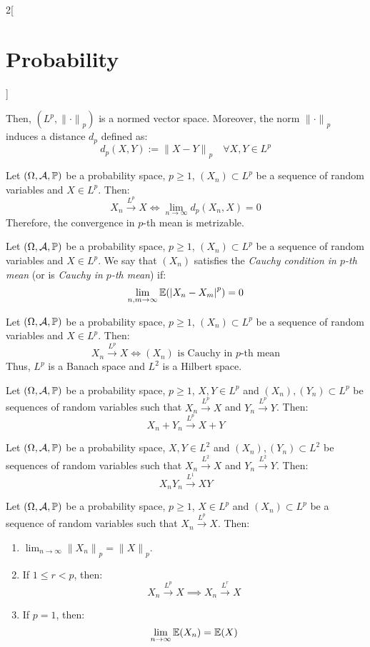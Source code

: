 \documentclass[../../../main.tex]{subfiles}
\begin{document}
\begin{multicols}{2}[\section{Probability}]
\begin{prop}
$$    $$
    Then, $(L^p,{\|\cdot\|}_p)$ is a normed vector space. Moreover, the norm ${\|\cdot\|}_p$ induces a distance $d_p$ defined as:
    $$d_p(X,Y):={\|X-Y\|}_p\quad\forall X,Y\in L^p$$
  \end{prop}
  \begin{prop}
    Let $(\Omega,\mathcal{A},\mathbb{P})$ be a probability space, $p\geq 1$, $(X_n)\subset L^p$ be a sequence of random variables and $X\in L^p$. Then:
    $$X_n\overset{L^p}{\longrightarrow} X\iff\lim_{n\to\infty}d_p(X_n,X)=0$$
    Therefore, the convergence in $p$-th mean is metrizable.
  \end{prop}
  \begin{definition}
    Let $(\Omega,\mathcal{A},\mathbb{P})$ be a probability space, $p\geq 1$, $(X_n)\subset L^p$ be a sequence of random variables and $X\in L^p$. We say that $(X_n)$ satisfies the \textit{Cauchy condition in $p$-th mean} (or is \textit{Cauchy in $p$-th mean}) if: $$\lim_{n,m\to\infty}\mathbb{E}({|X_n-X_m|}^p)=0$$
  \end{definition}
  \begin{prop}
    Let $(\Omega,\mathcal{A},\mathbb{P})$ be a probability space, $p\geq 1$, $(X_n)\subset L^p$ be a sequence of random variables and $X\in L^p$. Then:
    $$X_n\overset{L^p}{\longrightarrow} X\iff(X_n)\text{ is Cauchy in $p$-th mean}$$
    Thus, $L^p$ is a Banach space and $L^2$ is a Hilbert space.
  \end{prop}
  \begin{prop}
    Let $(\Omega,\mathcal{A},\mathbb{P})$ be a probability space, $p\geq 1$, $X,Y\in L^p$ and $(X_n),(Y_n)\subset L^p$ be sequences of random variables such that $X_n\overset{L^p}{\longrightarrow} X$ and $Y_n\overset{L^p}{\longrightarrow} Y$. Then: $$X_n+Y_n\overset{L^p}{\longrightarrow} X+Y$$
  \end{prop}
  \begin{prop}
    Let $(\Omega,\mathcal{A},\mathbb{P})$ be a probability space, $X,Y\in L^2$ and $(X_n),(Y_n)\subset L^2$ be sequences of random variables such that $X_n\overset{L^2}{\longrightarrow} X$ and $Y_n\overset{L^2}{\longrightarrow} Y$. Then: $$X_nY_n\overset{L^1}{\longrightarrow} XY$$
  \end{prop}
  \begin{prop}
    Let $(\Omega,\mathcal{A},\mathbb{P})$ be a probability space, $p\geq 1$, $X\in L^p$ and $(X_n)\subset L^p$ be a sequence of random variables such that $X_n\overset{L^p}{\longrightarrow} X$. Then:
    \begin{enumerate}
      \item $\displaystyle\lim_{n\to\infty}{\|X_n\|}_p={\|X\|}_p$.
      \item If $1\leq r< p$, then: $$X_n\overset{L^p}{\longrightarrow} X\implies X_n\overset{L^r}{\longrightarrow} X$$
      \item If $p=1$, then: $$\lim_{n\to\infty}\mathbb{E}(X_n)=\mathbb{E}(X)$$
    \end{enumerate}
  \end{prop}

\end{multicols}
\end{document}
